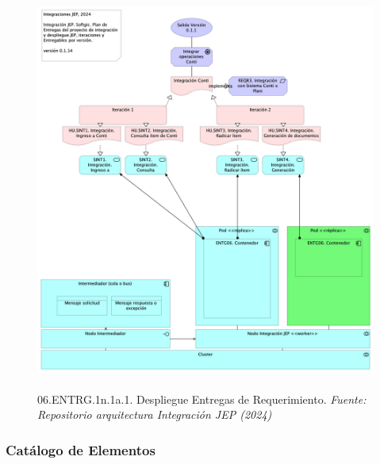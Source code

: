 \documentclass[
  paper=a4,
  ,captions=tableheading
]{scrartcl}
\begin{document}
\begin{figure}
\centering
\includegraphics[width=\textwidth,height=5.20833in]{images/06.ENTRG.1n.1a.1.DespliegueEntregasdeRequerimiento.png}
\caption{06.ENTRG.1n.1a.1. Despliegue Entregas de Requerimiento.
\emph{Fuente: Repositorio arquitectura Integración JEP
(2024)}}\label{fig:id-203e737545e449e59334b47d3034d956}
\end{figure}

\subsubsection{Catálogo de
Elementos}\label{sec:catuxe1logo-de-elementos-8}
\end{document}
